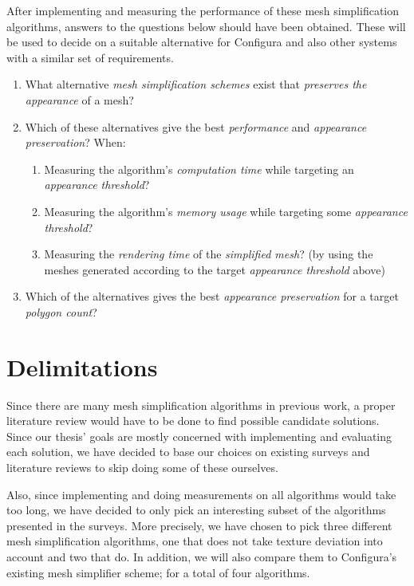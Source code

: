 After implementing and measuring the performance of these mesh simplification algorithms, answers to the questions below should have been obtained. These will be used to decide on a suitable alternative for Configura and also other systems with a similar set of requirements.

\begin{enumerate}
\item What alternative \emph{mesh simplification schemes} exist that \emph{preserves the appearance} of a mesh?

\item{Which of these alternatives give the best \emph{performance} and \emph{appearance preservation}? When:
  \begin{enumerate}
  \item Measuring the algorithm's \emph{computation time} while targeting an \emph{appearance threshold}?
  \item Measuring the algorithm's \emph{memory usage} while targeting some \emph{appearance threshold}?
  \item Measuring the \emph{rendering time} of the \emph{simplified mesh}?
        (by using the meshes generated according to the target \emph{appearance threshold} above)
  \end{enumerate}
}
\item Which of the alternatives gives the best \emph{appearance preservation} for a target \emph{polygon count}?
\end{enumerate}


\section{Delimitations}
\label{sec:delimitations}

Since there are many mesh simplification algorithms in previous work, a proper literature review would have to be done to find possible candidate solutions. Since our thesis' goals are mostly concerned with implementing and evaluating each solution, we have decided to base our choices on existing surveys and literature reviews to skip doing some of these ourselves.

Also, since implementing and doing measurements on all algorithms would take too long, we have decided to only pick an interesting subset of the algorithms presented in the surveys. More precisely, we have chosen to pick three different mesh simplification algorithms, one that does not take texture deviation into account and two that do. In addition, we will also compare them to Configura's existing mesh simplifier scheme; for a total of four algorithms.

